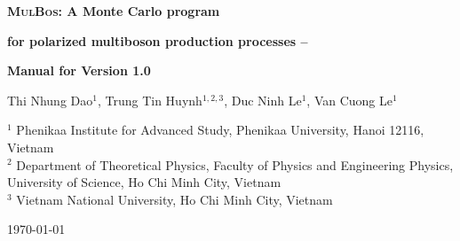 \documentclass[english,12pt]{article}
\begin{document}
\begin{titlepage}
{\begin{flushright}{
 \begin{minipage}{8.5cm}
\end{minipage}}\end{flushright}}
\vspace{1cm}
\begin{center} {\Large \bf \textsc{MulBos}: A Monte Carlo program
    } 
\end{center}
\begin{center}
 {\Large \bf  for polarized multiboson production processes --}
\end{center}
\begin{center}
 {\Large \bf  Manual for Version 1.0}
\end{center}
\vspace{0.6cm}
\begin{center}

{\renewcommand{\baselinestretch}{4}
Thi Nhung Dao$^{1}$,
Trung Tin Huynh$^{1,2,3}$,
Duc Ninh Le$^{1}$,
Van Cuong Le$^{1}$
}
\end{center}
\vspace{0.4cm}
\begin{center}
  $^{1}$ Phenikaa Institute for Advanced Study, Phenikaa University, Hanoi 12116, Vietnam \\ \noindent
  $^{2}$ Department of Theoretical Physics, Faculty of Physics and Engineering Physics, University of Science, Ho Chi
Minh City, Vietnam\\ \noindent
  $^{3}$ Vietnam National University, Ho Chi Minh City, Vietnam
\end{center}
\vspace{0.6cm}

\newpage

\begin{abstract}

\noindent
  \textsc{MulBos} (for MultiBoson production) is a parton-level program to calculate polarized cross sections 
  for $W^+W^-$, $W^\pm Z$, and $ZZ$ production processes with fully leptonic decays at the LHC. 
  The calculations are performed at next-to-leading order (NLO) QCD+EW accuracy. 
  In this manual, we explain how to install and run the program. Important practical details are also provided. 
  Extension to triboson production processes will be added in the future. 
\end{abstract}
\today
\end{titlepage}
\end{document}
